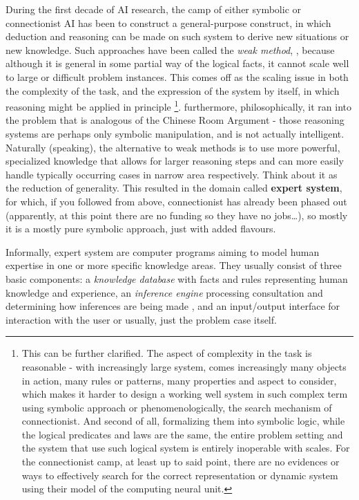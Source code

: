 During the first decade of AI research, the camp of either symbolic or connectionist AI has been to construct a general-purpose construct, in which deduction and reasoning can be made on such system to derive new situations or new knowledge. Such approaches have been called the \textit{weak method}, \cite{10.5555/1671238}, because although it is general in some partial way of the logical facts, it cannot scale well to large or difficult problem instances. This comes off as the scaling issue in both the complexity of the task, and the expression of the system by itself, in which reasoning might be applied in principle \footnote{This can be further clarified. The aspect of complexity in the task is reasonable - with increasingly large system, comes increasingly many objects in action, many rules or patterns, many properties and aspect to consider, which makes it harder to design a working well system in such complex term using symbolic approach or phenomenologically, the search mechanism of connectionist. And second of all, formalizing them into symbolic logic, while the logical predicates and laws are the same, the entire problem setting and the system that use such logical system is entirely inoperable with scales. For the connectionist camp, at least up to said point, there are no evidences or ways to effectively search for the correct representation or dynamic system using their model of the computing neural unit.}. furthermore, philosophically, it ran into the problem that is analogous of the Chinese Room Argument - those reasoning systems are perhaps only symbolic manipulation, and is not actually intelligent. Naturally (speaking), the alternative to weak methods is to use more powerful, specialized knowledge that allows for larger reasoning steps and can more easily handle typically occurring cases in narrow area respectively. Think about it as the reduction of generality. This resulted in the domain called \textbf{expert system}, for which, if you followed from above, connectionist has already been phased out (apparently, at this point there are no funding so they have no jobs\dots), so mostly it is a mostly pure symbolic approach, just with added flavours.  

Informally, expert system are computer programs aiming to model human expertise in one or more specific knowledge areas. They usually consist of three basic components: a \textit{knowledge database}   with facts and rules representing human knowledge and experience, an \textit{inference engine} processing consultation and determining how inferences are being made , and an input/output interface for interaction with the user or usually, just the problem case itself. 

